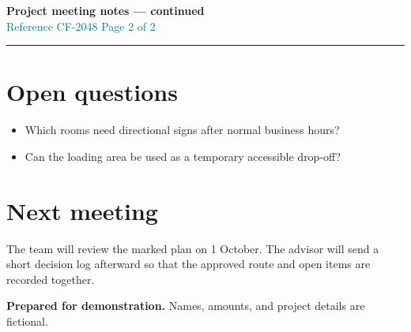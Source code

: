 \documentclass[a4paper,10pt]{article}
\begin{document}
\newpage
{\Large\bfseries\color{ink} Project meeting notes --- continued}\\
\textcolor{teal}{Reference CF-2048 \hfill Page 2 of 2}
\vspace{8pt}
\hrule

\section*{Open questions}
\begin{itemize}
  \item Which rooms need directional signs after normal business hours?
  \item Can the loading area be used as a temporary accessible drop-off?
\end{itemize}

\section*{Next meeting}
The team will review the marked plan on 1 October. The advisor will send a
short decision log afterward so that the approved route and open items are
recorded together.

\vfill
\colorbox{pale}{%
  \parbox{0.94\textwidth}{%
    \textbf{\textcolor{ink}{Prepared for demonstration.}}
    Names, amounts, and project details are fictional.}}
\end{document}
